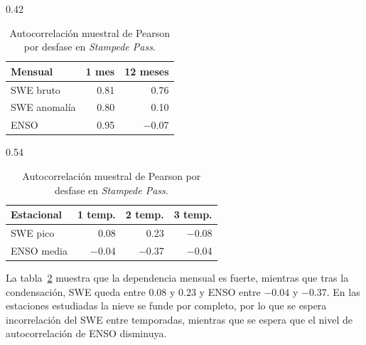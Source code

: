 \documentclass{article}
\begin{document}
\begin{table}[ht]
\centering
\small
\setlength{\tabcolsep}{3pt}
\begin{subtable}[b]{0.42\linewidth}
\centering
\begin{tabular}{lrr}
\toprule
Mensual & 1 mes & 12 meses \\
\midrule
SWE bruto & 0.81 & 0.76 \\
SWE anomalía & 0.80 & 0.10 \\
ENSO & 0.95 & $-$0.07 \\
\bottomrule
\end{tabular}
\caption{Antes (mensual)}
\end{subtable}
\hfill
\begin{subtable}[b]{0.54\linewidth}
\centering
\begin{tabular}{lrrr}
\toprule
Estacional & 1 temp. & 2 temp. & 3 temp. \\
\midrule
SWE pico & 0.08 & 0.23 & $-$0.08 \\
ENSO media & $-$0.04 & $-$0.37 & $-$0.04 \\
\bottomrule
\end{tabular}
\caption{Después (estacional)}
\end{subtable}
\caption{Autocorrelación muestral de Pearson por desfase en \textit{Stampede Pass}.}
\label{tab:ac}
\end{table}

La tabla~\ref{tab:ac} muestra que la dependencia mensual es fuerte, mientras que tras la condensación, SWE queda entre $0.08$ y $0.23$ y ENSO entre $-0.04$ y $-0.37$. En las estaciones estudiadas la nieve se funde por completo, por lo que se espera incorrelación del SWE entre temporadas, mientras que se espera que el nivel de autocorrelación de ENSO disminuya.
\end{document}
